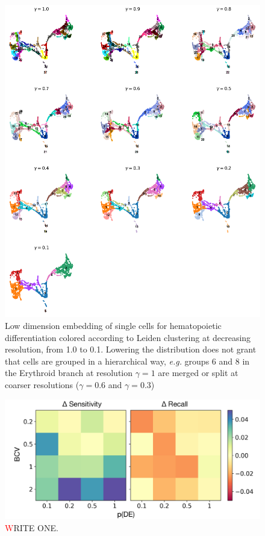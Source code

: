 \documentclass[11pt, titlepage, twoside]{article}
\begin{document}
\begin{figure}[htbp]
\centering
\includegraphics[keepaspectratio,width=\textwidth,height=0.75\textheight]{Figure_Paul15_Leiden_r.png}
\caption[]{Low dimension embedding of single cells for hematopoietic differentiation colored according to Leiden clustering at decreasing resolution, from 1.0 to 0.1. Lowering the distribution does not grant that cells are grouped in a hierarchical way, \emph{e.g.} groups 6 and 8 in the Erythroid branch at resolution $\gamma=1$ are merged or split at coarser resolutions ($\gamma=0.6$ and $\gamma=0.3$)}\label{Figure_Paul15_Leiden_r}
\end{figure}

\begin{figure}[htbp]
\centering
\includegraphics[keepaspectratio,width=\textwidth,width=0.50\textheight]{Figure_DE.png}
\caption[]{\textcolor{red} WRITE ONE. }\label{Figure_DE}
\end{figure}
\end{document}
